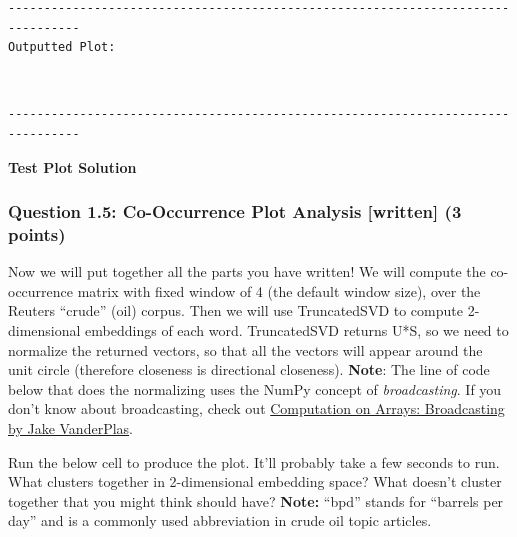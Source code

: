 \documentclass[11pt]{article}
\begin{document}
    \begin{Verbatim}[commandchars=\\\{\}]
--------------------------------------------------------------------------------
Outputted Plot:
    \end{Verbatim}

    \begin{center}
    \end{center}
    { \hspace*{\fill} \\}
    
    \begin{Verbatim}[commandchars=\\\{\}]
--------------------------------------------------------------------------------
    \end{Verbatim}

    \textbf{Test Plot Solution}

    \hypertarget{question-1.5-co-occurrence-plot-analysis-written-3-points}{%
\subsubsection{Question 1.5: Co-Occurrence Plot Analysis {[}written{]}
(3
points)}\label{question-1.5-co-occurrence-plot-analysis-written-3-points}}

Now we will put together all the parts you have written! We will compute
the co-occurrence matrix with fixed window of 4 (the default window
size), over the Reuters ``crude'' (oil) corpus. Then we will use
TruncatedSVD to compute 2-dimensional embeddings of each word.
TruncatedSVD returns U*S, so we need to normalize the returned vectors,
so that all the vectors will appear around the unit circle (therefore
closeness is directional closeness). \textbf{Note}: The line of code
below that does the normalizing uses the NumPy concept of
\emph{broadcasting}. If you don't know about broadcasting, check out
\href{https://jakevdp.github.io/PythonDataScienceHandbook/02.05-computation-on-arrays-broadcasting.html}{Computation
on Arrays: Broadcasting by Jake VanderPlas}.

Run the below cell to produce the plot. It'll probably take a few
seconds to run. What clusters together in 2-dimensional embedding space?
What doesn't cluster together that you might think should have?
\textbf{Note:} ``bpd'' stands for ``barrels per day'' and is a commonly
used abbreviation in crude oil topic articles.
\end{document}
